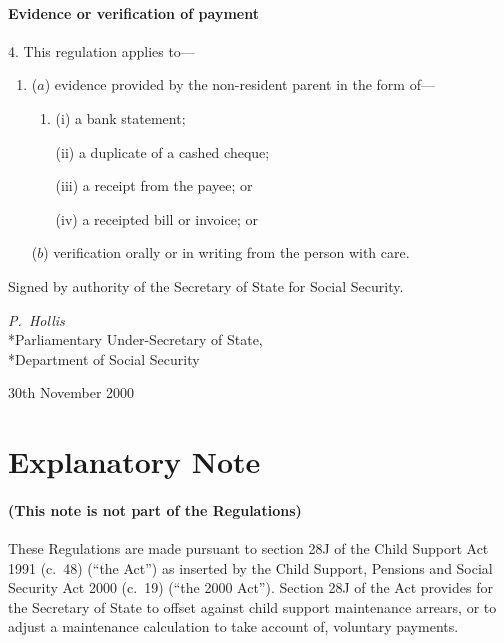 \documentclass[12pt,a4paper]{article}
\begin{document}
\subsection[4. Evidence or verification of payment]{Evidence or verification of payment}

4.  This regulation applies to—
\begin{enumerate}\item[]
($a$) evidence provided by the non-resident parent in the form of—
\begin{enumerate}\item[]
(i) a bank statement;

(ii) a duplicate of a cashed cheque;

(iii) a receipt from the payee; or

(iv) a receipted bill or invoice; or
\end{enumerate}

($b$) verification orally or in writing from the person with care.
\end{enumerate}

\bigskip

Signed 
by authority of the Secretary of State for Social Security.

{\raggedleft
\emph{P.~Hollis}\\*Parliamentary Under-Secretary of State,\\*Department of Social Security

}

30th November 2000

\small

\part{Explanatory Note}

\renewcommand\parthead{--- Explanatory Note}

\subsection*{(This note is not part of the Regulations)}

These Regulations are made pursuant to section 28J of the Child Support Act 1991 (c.\ 48) (“the Act”) as inserted by the Child Support, Pensions and Social Security Act 2000 (c.\ 19) (“the 2000 Act”). Section 28J of the Act provides for the Secretary of State to offset against child support maintenance arrears, or to adjust a maintenance calculation to take account of, voluntary payments.
\end{document}
